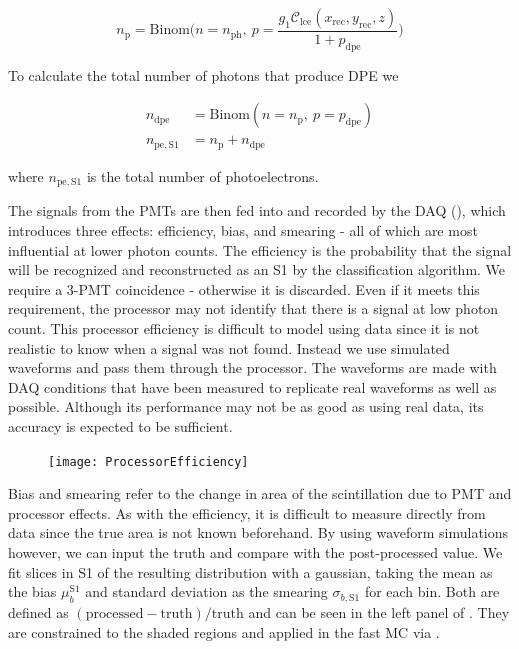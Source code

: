 \begin{equation}
n_{\mathrm{p}} = \mathrm{Binom} \bigg( n = n_{\mathrm{ph}},\ p =
\frac{g_1 \mathcal{C}_{\mathrm{lce}}(x_{\mathrm{rec}}, y_{\mathrm{rec}}, z)}{1 + p_{\mathrm{dpe}}} \bigg)
\label{eq:er_nr_calibrations_parameter_determ_det_phys_npe}
\end{equation}

To calculate the total number of photons that produce DPE we

\begin{equation}
\begin{aligned}
n_{\mathrm{dpe}} &= \mathrm{Binom} (n = n_{\mathrm{p}},\ p = p_{\mathrm{dpe}} ) \\
n_{\mathrm{pe,S1}} &= n_{\mathrm{p}} + n_{\mathrm{dpe}}
\end{aligned}
\end{equation}

\noindent where $n_{\mathrm{pe,S1}}$ is the total number of photoelectrons.

The signals from the PMTs are then fed into and recorded by the DAQ (), which introduces three effects:
efficiency, bias, and smearing - all of which are most influential at lower photon counts.  The efficiency is the probability that the
signal will be recognized and reconstructed as an S1 by the
classification algorithm.  We require a 3-PMT coincidence - otherwise it is discarded.  Even if it meets this requirement, the processor
may not identify that there is a signal at low photon count.  This processor efficiency is difficult to model using data since it is
not realistic to know when a signal was not found.  Instead we use simulated waveforms and pass them through the processor.  The
waveforms are made with DAQ conditions that have been measured to replicate real waveforms as well as possible.  Although its performance
may not be as good as using real data, its accuracy is expected to be sufficient.

\begin{figure}
\centering
\texttt{[image: ProcessorEfficiency]}
\label{fig:er_nr_calibrations_parameter_determ_det_phys_proc_eff}
\end{figure}

Bias and smearing refer to the change in area of the scintillation due to PMT and processor effects.  As with the efficiency, it is
difficult to measure directly from data since the true area is not known beforehand.  By using waveform simulations however, we can input
the truth and compare with the post-processed value.  We fit slices in S1 of the resulting distribution with a gaussian, taking the mean
as the bias $\mu_{b}^{\mathrm{S1}}$ and standard deviation as the smearing $\sigma_{b, \mathrm{S1}}$ for each bin.  Both are defined
as $(\mathrm{processed} - \mathrm{truth}) / \mathrm{truth}$ and can be seen in the left panel of
.  They are constrained to the shaded regions and applied in
the fast MC via .

